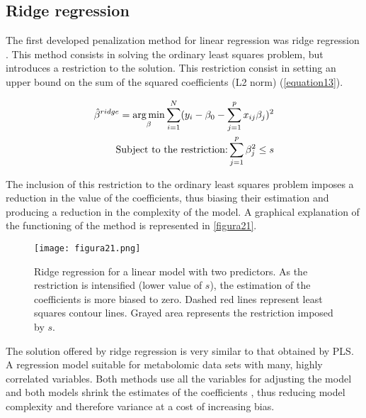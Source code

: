 \subsection{Ridge regression}
The first developed penalization method for linear regression was ridge regression \parencite{hoerl1970ridge}. This method consists in solving the ordinary least squares problem, but introduces a restriction to the solution. This restriction consist in setting an upper bound on the sum of the squared coefficients (L2 norm) (\autoref{equation13}).

\begin{equation}
\label{equation13}
\begin{split}
\hat{\beta}^{ridge}=\operatorname*{arg\,min}_\beta \sum\limits_{i=1}^N (y_{i}-\beta_{0}-\sum\limits_{j=1}^p x_{ij}\beta_{j})^{2} \\
\textrm{Subject to the restriction:}  \sum\limits_{j=1}^p \beta_{j}^2\leq s
\end{split}
\end{equation}

The inclusion of this restriction to the ordinary least squares problem imposes a reduction in the value of the coefficients, thus biasing their estimation and producing a reduction in the complexity of the model. A graphical explanation of the functioning of the method is represented in \autoref{figura21}.

\begin{figure}[hbtp]
\centering
\texttt{[image: figura21.png]}
\caption[Ridge regression for a linear model with two predictors]{Ridge regression for a linear model with two predictors. As the restriction is intensified (lower value of $s$), the estimation of the coefficients is more biased to zero. Dashed red lines represent least squares contour lines. Grayed area represents the restriction imposed by $s$.}
\label{figura21}
\end{figure}

The solution offered by ridge regression is very similar to that obtained by PLS. A regression model suitable for metabolomic data sets with many, highly correlated variables. Both methods use all the variables for adjusting the model and both models shrink the estimates of the coefficients \parencite{de1995pls}, thus reducing model complexity and therefore variance at a cost of increasing bias.

